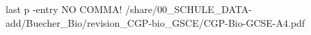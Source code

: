 

 last p -entry NO COMMA!
     {/share/00_SCHULE_DATA-add/Buecher_Bio/revision_CGP-bio_GSCE/CGP-Bio-GCSE-A4.pdf}
